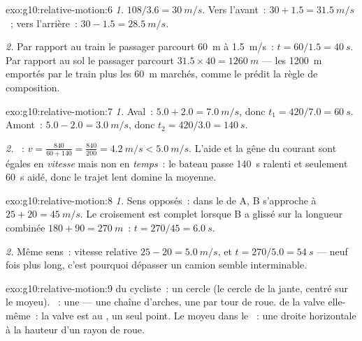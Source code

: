 \begin{solution}{exo:g10:relative-motion:6}
\emph{1.} $108/3.6 = \qty{30}{m/s}$. Vers l'avant~:
$30 + 1.5 = \qty{31.5}{m/s}$~; vers l'arrière~:
$30 - 1.5 = \qty{28.5}{m/s}$.

\emph{2.} Par rapport au train le passager parcourt \qty{60}{m} à
\qty{1.5}{m/s}~: $t = 60/1.5 = \qty{40}{s}$. Par rapport au sol le
passager parcourt $31.5 \times 40 = \qty{1260}{m}$ --- les
\qty{1200}{m} emportés par le train plus les \qty{60}{m} marchés,
comme le prédit la règle de composition.
\end{solution}

\begin{solution}{exo:g10:relative-motion:7}
\emph{1.} Aval~: $5.0 + 2.0 = \qty{7.0}{m/s}$, donc
$t_1 = 420/7.0 = \qty{60}{s}$. Amont~: $5.0 - 2.0 = \qty{3.0}{m/s}$,
donc $t_2 = 420/3.0 = \qty{140}{s}$.

\emph{2.} ~: $v = \frac{840}{60 + 140}
= \frac{840}{200} = \qty{4.2}{m/s} < \qty{5.0}{m/s}$. L'aide et la
gêne du courant sont égales en \emph{vitesse} mais non en
\emph{temps}~: le bateau passe \qty{140}{s} ralenti et seulement
\qty{60}{s} aidé, donc le trajet lent domine la moyenne.
\end{solution}

\begin{solution}{exo:g10:relative-motion:8}
\emph{1.} Sens opposés~: dans le  de A, B s'approche à
$25 + 20 = \qty{45}{m/s}$. Le croisement est complet lorsque B a
glissé sur la longueur combinée $180 + 90 = \qty{270}{m}$~:
$t = 270/45 = \qty{6.0}{s}$.

\emph{2.} Même sens~: vitesse relative $25 - 20 = \qty{5.0}{m/s}$, et
$t = 270/5.0 = \qty{54}{s}$ --- neuf fois plus long, c'est pourquoi
dépasser un camion semble interminable.
\end{solution}

\begin{solution}{exo:g10:relative-motion:9}
 du cycliste~: un cercle (le cercle de la jante, centré sur
le moyeu). ~: une
 --- une chaîne d'arches, une par tour de
roue.  de la valve elle-même~: la valve est au
, un seul point. Le moyeu dans le
~: une droite horizontale à la hauteur d'un
rayon de roue.
\end{solution}

